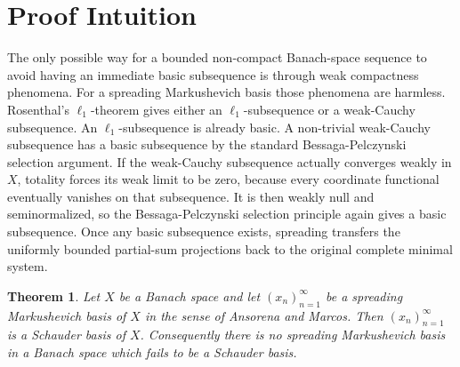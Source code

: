 \documentclass[11pt]{article}
\newtheorem{theorem}{Theorem}
\newcommand{\xb}{(x_n)_{n=1}^{\infty}}
\begin{document}
\section*{Proof Intuition}

The only possible way for a bounded non-compact Banach-space sequence to avoid
having an immediate basic subsequence is through weak compactness phenomena.
For a spreading Markushevich basis those phenomena are harmless. Rosenthal's
\(\ell_1\)-theorem gives either an \(\ell_1\)-subsequence or a weak-Cauchy
subsequence. An \(\ell_1\)-subsequence is already basic. A non-trivial
weak-Cauchy subsequence has a basic subsequence by the standard
Bessaga-Pelczynski selection argument. If the weak-Cauchy subsequence actually
converges weakly in \(X\), totality forces its weak limit to be zero, because
every coordinate functional eventually vanishes on that subsequence. It is then
weakly null and seminormalized, so the Bessaga-Pelczynski selection principle
again gives a basic subsequence. Once any basic subsequence exists, spreading
transfers the uniformly bounded partial-sum projections back to the original
complete minimal system.

\begin{theorem}
Let \(X\) be a Banach space and let \(\xb\) be a spreading Markushevich basis
of \(X\) in the sense of Ansorena and Marcos. Then \(\xb\) is a Schauder basis
of \(X\). Consequently there is no spreading Markushevich basis in a Banach
space which fails to be a Schauder basis.
\end{theorem}
\end{document}
